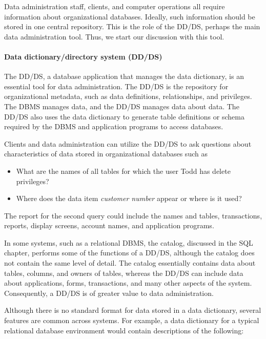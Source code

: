 \documentclass[
]{article}
\begin{document}
Data administration staff, clients, and computer operations all require
information about organizational databases. Ideally, such information
should be stored in one central repository. This is the role of the
DD/DS, perhaps the main data administration tool. Thus, we start our
discussion with this tool.

\hypertarget{data-dictionarydirectory-system-ddds}{%
\paragraph*{Data dictionary/directory system (DD/DS)}\label{data-dictionarydirectory-system-ddds}}

The DD/DS, a database application that manages the data dictionary, is
an essential tool for data administration. The DD/DS is the repository
for organizational metadata, such as data definitions, relationships,
and privileges. The DBMS manages data, and the DD/DS manages data about
data. The DD/DS also uses the data dictionary to generate table
definitions or schema required by the DBMS and application programs to
access databases.

Clients and data administration can utilize the DD/DS to ask questions
about characteristics of data stored in organizational databases such as

\begin{itemize}
\item
  What are the names of all tables for which the user Todd has delete
  privileges?
\item
  Where does the data item \emph{customer number} appear or where is it
  used?
\end{itemize}

The report for the second query could include the names and tables,
transactions, reports, display screens, account names, and application
programs.

In some systems, such as a relational DBMS, the catalog, discussed in
the SQL chapter, performs some of the functions of a DD/DS, although the
catalog does not contain the same level of detail. The catalog
essentially contains data about tables, columns, and owners of tables,
whereas the DD/DS can include data about applications, forms,
transactions, and many other aspects of the system. Consequently, a
DD/DS is of greater value to data administration.

Although there is no standard format for data stored in a data
dictionary, several features are common across systems. For example, a
data dictionary for a typical relational database environment would
contain descriptions of the following:
\end{document}
